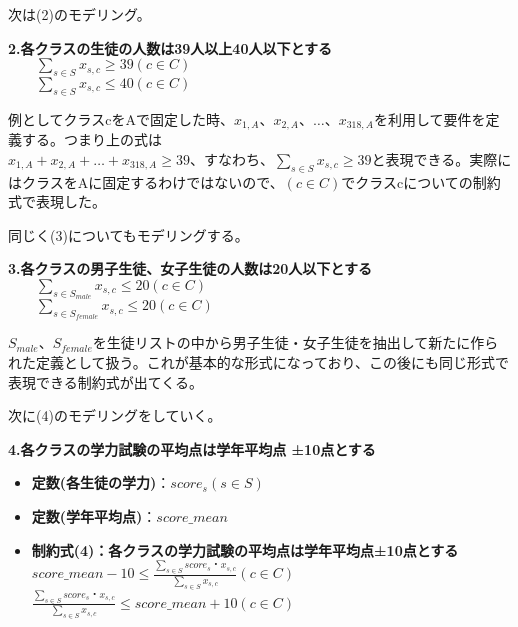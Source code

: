 \documentclass{jsarticle}
\begin{document}
\par 次は(2)のモデリング。
\begin{itembox}[l]{{\bf 2.各クラスの生徒の人数は39人以上40人以下とする}}
		${\qquad \displaystyle \sum_{s \in S}x_{s,c} \geq  39}　(c \in C)$\\
		${\qquad \displaystyle \sum_{s \in S}x_{s,c} \le 40}　(c \in C)$
\end{itembox}
\par 例としてクラスcをAで固定した時、$x_{1,A}、 x_{2,A}、 …、 x_{318,A}$を利用して要件を定義する。つまり上の式は\\
$x_{1,A}+ x_{2,A}+ …+x_{318,A}\geq 39$、すなわち、${\displaystyle \sum_{s \in S}x_{s,c} \geq  39}$と表現できる。実際にはクラスをAに固定するわけではないので、$(c \in C)$でクラスcについての制約式で表現した。

\newpage

\par 同じく(3)についてもモデリングする。

\begin{itembox}[l]{{\bf 3.各クラスの男子生徒、女子生徒の人数は20人以下とする}}
		${\qquad \displaystyle \sum_{s \in S_{male}}x_{s,c} \le  20}　(c \in C)$\\
		${\qquad \displaystyle \sum_{s \in S_{female}}x_{s,c} \le 20}　(c \in C)$
\end{itembox}
$S_{male}、S_{female}$を生徒リストの中から男子生徒・女子生徒を抽出して新たに作られた定義として扱う。これが基本的な形式になっており、この後にも同じ形式で表現できる制約式が出てくる。

\vspace\baselineskip	

次に(4)のモデリングをしていく。
\begin{itembox}[l]{{\bf 4.各クラスの学力試験の平均点は学年平均点 ±10点とする}}
	\begin{itemize}
		\item {\bf 定数(各生徒の学力)}：$score_{s}　(s \in S)$
		\item {\bf 定数(学年平均点)}：${score\_mean}$
		\item {\bf 制約式(4)：各クラスの学力試験の平均点は学年平均点±10点とする}
		\\ $score\_mean-10 \le \frac{\displaystyle \sum_{s \in S}score_{s}・x_{s,c}}{\displaystyle \sum_{s \in S}x_{s,c}}　(c \in C)$
		\\ $\frac{\displaystyle \sum_{s \in S}score_{s}・x_{s,c}}{\displaystyle \sum_{s \in S}x_{s,c}} \le score\_mean+10　(c \in C)$
	\end{itemize}
\end{itembox}
\end{document}
